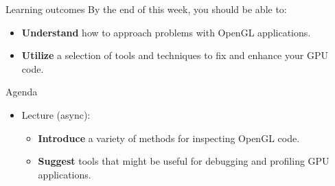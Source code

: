 \begin{frame}{Learning outcomes}
	By the end of this week, you should be able to:
	\begin{itemize}
		\item \textbf{Understand} how to approach problems with OpenGL applications.
		\item \textbf{Utilize} a selection of tools and techniques to fix and enhance your GPU code.
	\end{itemize}
\end{frame}

\begin{frame}{Agenda}
	\begin{itemize}
		\pause\item Lecture (async):
		\begin{itemize}
			\item \textbf{Introduce} a variety of methods for inspecting OpenGL code.
			\item \textbf{Suggest} tools that might be useful for debugging and profiling GPU applications.
		\end{itemize}
	\end{itemize}
\end{frame}